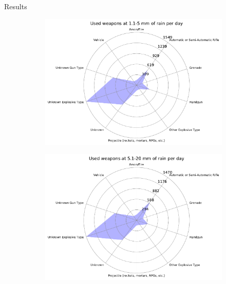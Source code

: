 \documentclass{beamer}
\begin{document}
\begin{frame}{Results}
\begin{figure}
\begin{subfigure}[b]{0.3\textwidth}
		\end{subfigure}
		\begin{subfigure}[b]{0.3\textwidth}
			\includegraphics[width=\textwidth]{Rain-Weapon/rain11-5_starDiagram}
		\end{subfigure}
	\end{figure}
	\begin{figure}
		\begin{subfigure}[b]{0.3\textwidth}
			\includegraphics[width=\textwidth]{Rain-Weapon/rain51-20_starDiagram}
		\end{subfigure}
		\begin{subfigure}[b]{0.3\textwidth}

\end{subfigure}
\end{figure}
\end{frame}
\end{document}
